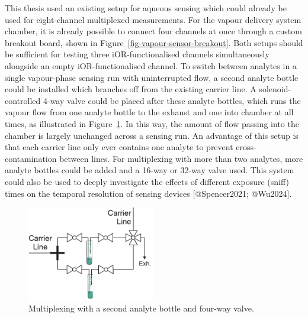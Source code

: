 \documentclass[
  letterpaper,
  DIV=11,
  numbers=noendperiod]{scrartcl}
\begin{document}
This thesis used an existing setup for aqueous sensing which could
already be used for eight-channel multiplexed measurements. For the
vapour delivery system chamber, it is already possible to connect four
channels at once through a custom breakout board, shown in
Figure~\ref{fig-vapour-sensor-breakout}. Both setups should be
sufficient for testing three iOR-functionalised channels simultaneously
alongside an empty iOR-functionalised channel. To switch between
analytes in a single vapour-phase sensing run with uninterrupted flow, a
second analyte bottle could be installed which branches off from the
existing carrier line. A solenoid-controlled 4-way valve could be placed
after these analyte bottles, which runs the vapour flow from one analyte
bottle to the exhaust and one into chamber at all times, as illustrated
in Figure~\ref{fig-vapour-sensor-multiplexing}. In this way, the amount
of flow passing into the chamber is largely unchanged across a sensing
run. An advantage of this setup is that each carrier line only ever
contains one analyte to prevent cross-contamination between lines. For
multiplexing with more than two analytes, more analyte bottles could be
added and a 16-way or 32-way valve used. This system could also be used
to deeply investigate the effects of different exposure (sniff) times on
the temporal resolution of sensing devices {[}@Spencer2021; @Wu2024{]}.

\begin{figure}

{\centering \includegraphics[width=0.5\textwidth,height=\textheight]{figures/ch9/multiplex-vapoursensor.png}

}

\caption{\label{fig-vapour-sensor-multiplexing}Multiplexing with a
second analyte bottle and four-way valve.}

\end{figure}
\end{document}
